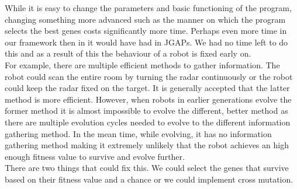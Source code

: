 \documentclass[a4paper,10pt]{article}
\begin{document}
While it is easy to change the parameters and basic functioning of the program, changing something more advanced such as the manner on which the program selects the
best genes costs significantly more time. Perhaps even more time in our framework then in it would have had in JGAPs. We had no time left to do this and as a result of
 this the behaviour of a robot is fixed early on. \\

For example, there are multiple efficient methods to gather information. The robot could scan the entire room by turning the radar continuously or the robot could
keep the radar fixed on the target. It is generally accepted that the latter method is more efficient. However, when robots in earlier generations evolve the former 
method it is almost impossible to evolve the different, better method as there are multiple evolution cycles needed to evolve to the different information gathering
 method. In the mean time, while evolving, it has no information gathering method making it extremely unlikely that the robot achieves an high enough fitness value to
survive and evolve further.  \\

There are two things that could fix this. We could select the genes that survive based on their fitness value and a chance or we could implement cross mutation. 

















  
\end{document}
